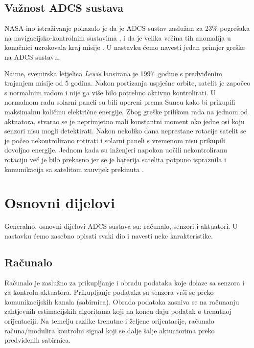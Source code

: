 \documentclass[times, utf8, diplomski, numeric]{templates/template}
\begin{document}
{{        \subsection{Važnost ADCS sustava}{
            NASA-ino istraživanje pokazalo je da je ADCS sustav zaslužan za 23\% pogrešaka na navigacijsko-kontrolnim sustavima , i da je velika većina tih anomalija u konačnici uzrokovala kraj misije \cite{greskeNaAdcsPostotak}. U nastavku ćemo navesti jedan primjer greške na ADCS sustavu.

            Naime, svemirska letjelica \emph{Lewis} \cite{lewis} lansirana je 1997. godine s predviđenim trajanjem misije od 5 godina. Nakon postizanja uspješne orbite, satelit je započeo s normalnim radom i nije ga više bilo potrebno aktivno kontrolirati. U normalnom radu solarni paneli su bili upereni prema Suncu kako bi prikupili maksimalnu količinu električne energije. Zbog greške prilikom rada na jednom od aktuatora, stvarao se je neprimjetno mali konstantni moment oko jedne osi koju senzori nisu mogli detektirati. Nakon nekoliko dana neprestane rotacije satelit se je počeo nekontrolirano rotirati i solarni paneli s vremenom nisu prikupili dovoljno energije. Jednom kada su inženjeri napokon uočili nekontroliranu rotaciju već je bilo prekasno jer se je baterija satelita potpuno ispraznila i komunikacija sa satelitom zauvijek prekinuta \cite{greskeNaAdcsSlucajevi}.
        }
    }

    \section{Osnovni dijelovi}{
        Generalno, osnovni dijelovi ADCS sustava su: računalo, senzori i aktuatori. U nastavku ćemo zasebno opisati svaki dio i navesti neke karakteristike.
 
        \subsection{Računalo}{
            Računalo je zaslužno za prikupljanje i obradu podataka koje dolaze sa senzora i za kontrolu aktuatora. Prikupljanje podataka sa senzora vrši se preko komunikacijskih kanala (sabirnica). Obrada podataka zasniva se na računanju zahtjevnih estimacijskih algoritama koji na koncu daju podatak o trenutnoj orijentaciji. Na temelju razlike trenutne i željene orijentacije, računalo računa/modulira kontrolni signal koji se dalje šalje aktuatorima preko predviđenih sabirnica. 

}}}
\end{document}
